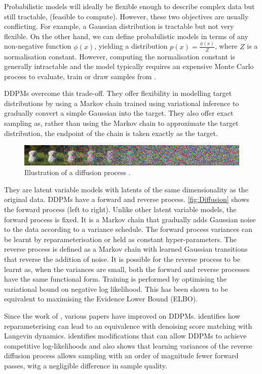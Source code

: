 \documentclass{article}
\begin{document}
Probabilistic models will ideally be flexible enough to describe complex data but still tractable, (feasible to compute). However, these two objectives are usually conflicting. For example, a Gaussian distribution is tractable but not very flexible. On the other hand, we can define probabilistic models in terms of any non-negative function $\phi(x)$, yielding a distribution $p(x)=\frac{\phi(x)}{Z}$, where $Z$ is a normalisation constant. However, computing the normalisation constant is generally intractable and the model typically requires an expensive Monte Carlo process to evaluate, train or draw samples from \parencite{Sohl-Dickstein-2015}.

DDPMs overcome this trade-off. They offer flexibility in modelling target distributions by using a Markov chain trained using variational inference to gradually convert a simple Gaussian into the target. They also offer exact sampling as, rather than using the Markov chain to approximate the target distribution, the endpoint of the chain is taken exactly as the target.

\begin{figure}[h]
\centering
\includegraphics[width=1\textwidth]{Diffusion.png}
\caption{\label{fig:Diffusion}Illustration of a diffusion process \parencite{Sohl-Dickstein-2015}.}
\end{figure}

They are latent variable models with latents of the same dimensionality as the original data. DDPMs have a forward and reverse process. \autoref{fig:Diffusion} shows the forward process (left to right). Unlike other latent variable models, the forward process is fixed. It is a Markov chain that gradually adds Gaussian noise to the data according to a variance schedule. The forward process variances can be learnt by reparameterisation or held as constant hyper-parameters. The reverse process is defined as a Markov chain with learned Gaussian transitions that reverse the addition of noise. It is possible for the reverse process to be learnt as, when the variances are small, both the forward and reverse processes have the same functional form. Training is performed by optimising the variational bound on negative log likelihood. This has been shown to be equivalent to maximising the Evidence Lower Bound (ELBO).

Since the work of \cite{Sohl-Dickstein-2015}, various papers have improved on DDPMs. \cite{Ho-2020} identifies how reparameterising can lead to an equivalence with denoising score matching with Langevin dynamics. \cite{Nichol-2021} identifies modifications that can allow DDPMs to achieve competitive log-likelihoods and also shows that learning variances of the reverse diffusion process allows sampling with an order of magnitude fewer forward passes, witg a negligible difference in sample quality.
\end{document}
